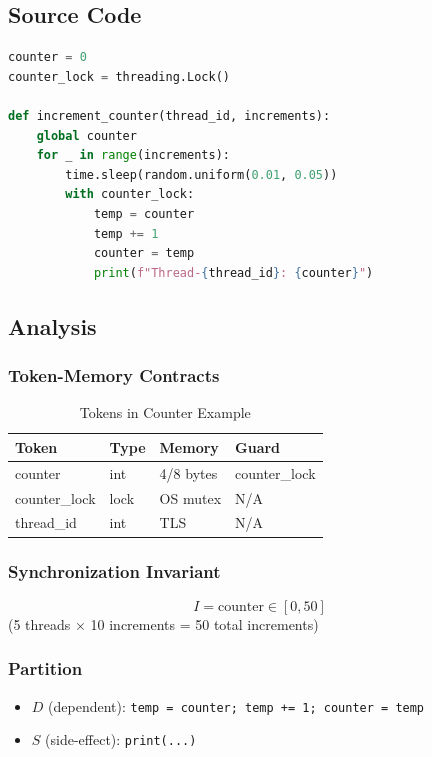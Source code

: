 \documentclass[11pt]{article}
\begin{document}
\subsection{Source Code}

\begin{lstlisting}[language=Python, caption=Thread-Safe Counter (Python)]
counter = 0
counter_lock = threading.Lock()

def increment_counter(thread_id, increments):
    global counter
    for _ in range(increments):
        time.sleep(random.uniform(0.01, 0.05))
        with counter_lock:
            temp = counter
            temp += 1
            counter = temp
            print(f"Thread-{thread_id}: {counter}")
\end{lstlisting}

\subsection{Analysis}

\subsubsection{Token-Memory Contracts}

\begin{table}[h]
\centering
\begin{tabular}{|l|l|l|l|}
\hline
Token & Type & Memory & Guard \\
\hline
counter & int & 4/8 bytes & counter\_lock \\
counter\_lock & lock & OS mutex & N/A \\
thread\_id & int & TLS & N/A \\
\hline
\end{tabular}
\caption{Tokens in Counter Example}
\end{table}

\subsubsection{Synchronization Invariant}

\[
I = \text{counter} \in [0, 50]
\]
(5 threads × 10 increments = 50 total increments)

\subsubsection{Partition}

\begin{itemize}
    \item $D$ (dependent): \texttt{temp = counter; temp += 1; counter = temp}
    \item $S$ (side-effect): \texttt{print(...)}
\end{itemize}
\end{document}
